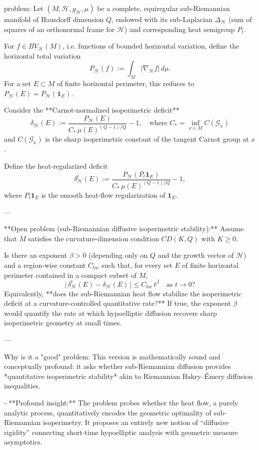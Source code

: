 problem:  
Let \((M, \mathcal{H}, g_{\mathcal{H}}, \mu)\) be a complete, equiregular sub-Riemannian manifold of Hausdorff dimension \(Q\), endowed with its sub-Laplacian \(\Delta_{\mathcal H}\) (sum of squares of an orthonormal frame for \(\mathcal H\)) and corresponding heat semigroup \(P_t\).  

For \(f \in BV_{\mathcal H}(M)\), i.e. functions of bounded horizontal variation, define the horizontal total variation  
\[
P_{\mathcal H}(f) := \int_M |\nabla_{\mathcal H} f|\, d\mu.
\]
For a set \(E \subset M\) of finite horizontal perimeter, this reduces to \(P_{\mathcal H}(E) = P_{\mathcal H}(\mathbf{1}_E)\).  

Consider the **Carnot-normalized isoperimetric deficit**
\[
\delta_{\mathcal H}(E)
:= \frac{P_{\mathcal H}(E)}{C_*\, \mu(E)^{(Q-1)/Q}} - 1,
\quad\text{where } C_* = \inf_{x\in M} C(\mathcal{G}_x)
\]
and \(C(\mathcal{G}_x)\) is the sharp isoperimetric constant of the tangent Carnot group at \(x\).  

Define the heat-regularized deficit
\[
\delta_{\mathcal H}^t(E)
:= \frac{P_{\mathcal H}(P_t\mathbf{1}_E)}{C_*\, \mu(E)^{(Q-1)/Q}} - 1,
\]
where \(P_t\mathbf{1}_E\) is the smooth heat-flow regularization of \(\mathbf{1}_E\).  

---

**Open problem (sub-Riemannian diffusive isoperimetric stability):**  
Assume that \(M\) satisfies the curvature-dimension condition \(CD(K,Q)\) with \(K \ge 0\).  

Is there an exponent \(\beta>0\) (depending only on \(Q\) and the growth vector of \(\mathcal H\)) and a region-wise constant \(C_{loc}\) such that, for every set \(E\) of finite horizontal perimeter contained in a compact subset of \(M\),
\[
\bigl|\,\delta_{\mathcal H}^t(E) - \delta_{\mathcal H}(E)\,\bigr| 
\le C_{loc}\, t^{\beta} \quad\text{as } t\to0?
\]
Equivalently, **does the sub-Riemannian heat flow stabilize the isoperimetric deficit at a curvature-controlled quantitative rate?**  
If true, the exponent \(\beta\) would quantify the rate at which hypoelliptic diffusion recovers sharp isoperimetric geometry at small times.

---

Why is it a "good" problem:  
This version is mathematically sound and conceptually profound: it asks whether sub-Riemannian diffusion provides *quantitative isoperimetric stability* akin to Riemannian Bakry–Émery diffusion inequalities.

- **Profound insight:** The problem probes whether the heat flow, a purely analytic process, quantitatively encodes the geometric optimality of sub-Riemannian isoperimetry. It proposes an entirely new notion of “diffusive rigidity” connecting short-time hypoelliptic analysis with geometric measure asymptotics.

